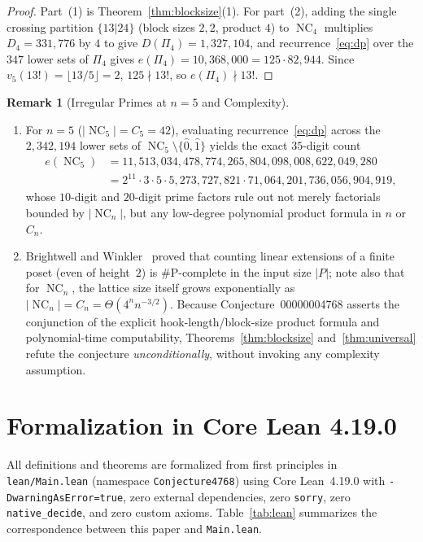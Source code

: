\documentclass[11pt]{article}
\theoremstyle{definition}
\newtheorem{remark}[theorem]{Remark}
\newcommand{\NC}{\operatorname{NC}}
\begin{document}
\begin{proof}
Part~(1) is Theorem~\ref{thm:blocksize}(1). For part~(2), adding the single crossing
partition $\{13|24\}$ (block sizes $2, 2$, product $4$) to $\NC_4$ multiplies $D_4 =
331{,}776$ by $4$ to give $D(\Pi_4) = 1{,}327{,}104$, and recurrence~\eqref{eq:dp} over
the $347$ lower sets of $\Pi_4$ gives $e(\Pi_4) = 10{,}368{,}000 = 125 \cdot 82{,}944$.
Since $v_5(13!) = \lfloor 13/5 \rfloor = 2$, $125 \nmid 13!$, so $e(\Pi_4) \nmid 13!$.
\end{proof}

\begin{remark}[Irregular Primes at $n = 5$ and Complexity]
\label{rem:complexity}
\leavevmode
\begin{enumerate}
  \item For $n = 5$ ($|\NC_5| = C_5 = 42$), evaluating recurrence~\eqref{eq:dp} across
  the $2{,}342{,}194$ lower sets of $\NC_5 \setminus \{\hat{0}, \hat{1}\}$ yields the
  exact $35$-digit count
  \begin{align*}
    e(\NC_5)
    &= 11{,}513{,}034{,}478{,}774{,}265{,}804{,}098{,}008{,}622{,}049{,}280 \\
    &= 2^{11} \cdot 3 \cdot 5 \cdot 5{,}273{,}727{,}821 \cdot
       71{,}064{,}201{,}736{,}056{,}904{,}919,
  \end{align*}
  whose $10$-digit and $20$-digit prime factors rule out not merely factorials bounded by
  $|\NC_n|$, but any low-degree polynomial product formula in $n$ or $C_n$.
  \item Brightwell and Winkler~\cite{BrightwellWinkler1991} proved that counting linear
  extensions of a finite poset (even of height~$2$) is $\mathrm{\#P}$-complete in the input
  size $|P|$; note also that for $\NC_n$, the lattice size itself grows exponentially as
  $|\NC_n| = C_n = \Theta(4^n n^{-3/2})$. Because Conjecture~00000004768 asserts the
  conjunction of the explicit hook-length/block-size product formula and polynomial-time
  computability, Theorems~\ref{thm:blocksize} and~\ref{thm:universal} refute the conjecture
  \emph{unconditionally}, without invoking any complexity assumption.
\end{enumerate}
\end{remark}

\section{Formalization in Core Lean 4.19.0}

All definitions and theorems are formalized from first principles in
\texttt{lean/Main.lean} (namespace \texttt{Conjecture4768}) using Core Lean~4.19.0 with
\texttt{-DwarningAsError=true}, zero external dependencies, zero \texttt{sorry}, zero
\texttt{native\_decide}, and zero custom axioms. Table~\ref{tab:lean} summarizes the
correspondence between this paper and \texttt{Main.lean}.
\end{document}
